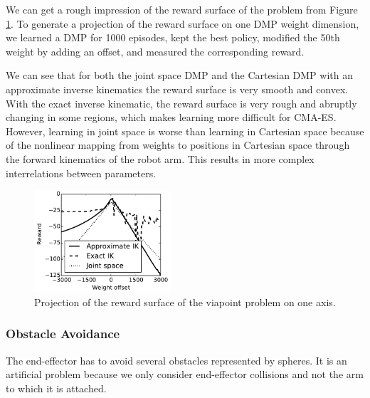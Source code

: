 \documentclass{article}
\begin{document}
We can get a rough impression of the reward surface of the problem
from Figure \ref{fig:viapoint_vary}.
To generate a projection of the reward surface on one DMP weight
dimension, we learned a DMP for 1000 episodes, kept the best policy,
modified the 50th weight by adding an offset, and measured the
corresponding reward.

We can see that for both the joint space DMP and the Cartesian DMP
with an approximate inverse kinematics the reward surface is very
smooth and convex. With the exact inverse kinematic, the reward
surface is very rough and abruptly changing in some regions, which
makes learning more difficult for CMA-ES. However, learning in joint
space is worse than learning in Cartesian space because of the
nonlinear mapping from weights to positions in Cartesian space
through the forward kinematics of the robot arm.
This results in more complex interrelations between parameters.

\begin{figure}
\includegraphics[width=0.45\textwidth]{vary_weight_viapoint}
\centering
\caption{
Projection of the reward surface of the viapoint problem on one axis.
}
\label{fig:viapoint_vary}
\end{figure}

\subsubsection{Obstacle Avoidance}

The end-effector has to avoid several obstacles represented by spheres.
It is an artificial problem because we only consider end-effector collisions
and not the arm to which it is attached.
\end{document}
